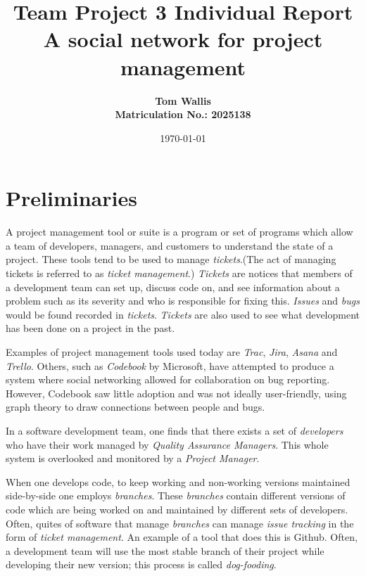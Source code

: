 \documentclass[10pt]{article}
\author{\bf Tom Wallis \\ \bf Matriculation No.: 2025138}
\date{\today}
\title{Team Project 3 Individual Report\\
A social network for project management\\ \vspace{4mm}
}
\begin{document}
\maketitle

\section{Preliminaries}\par
A project management tool or suite is a program or set of programs which allow a team of developers, managers, and customers to understand the state of a project. These tools tend to be used to manage \emph{tickets}.(The act of managing tickets is referred to as \emph{ticket management}.) \emph{Tickets} are notices that members of a development team can set up, discuss code on, and see information about a problem such as its severity and who is responsible for fixing this. \emph{Issues} and \emph{bugs} would be found recorded in \emph{tickets}. \emph{Tickets} are also used to see what development has been done on a project in the past. \par
Examples of project management tools used today are \emph{Trac}, \emph{Jira}, \emph{Asana} and \emph{Trello}. Others, such as \emph{Codebook} by Microsoft, have attempted to produce a system where social networking allowed for collaboration on bug reporting. However, Codebook saw little adoption and was not ideally user-friendly, using graph theory to draw connections between people and bugs. \par
In a software development team, one finds that there exists a set of \emph{developers} who have their work managed by \emph{Quality Assurance Managers}. This whole system is overlooked and monitored by a \emph{Project Manager}. \par
When one develops code, to keep working and non-working versions maintained side-by-side one employs \emph{branches}. These \emph{branches} contain different versions of code which are being worked on and maintained by different sets of developers. Often, quites of software that manage \emph{branches} can manage \emph{issue tracking} in the form of \emph{ticket management}. An example of a tool that does this is Github. Often, a development team will use the most stable branch of their project while developing their new version; this process is called \emph{dog-fooding}.\par
\end{document}
